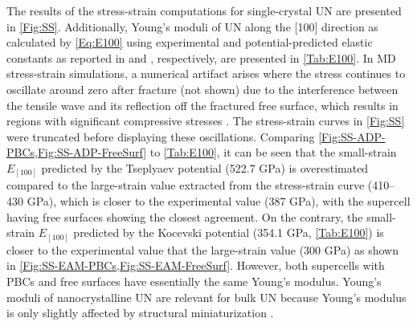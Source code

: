 \documentclass[applsci,article,submit,pdftex,moreauthors]{Definitions/mdpi}
\newcommand{\?}{\stackrel{?}{=}}
\begin{document}
The results of the stress-strain computations for single-crystal UN are presented in \cref{Fig:SS}. Additionally, Young's moduli of UN along the [100] direction as calculated by \cref{Eq:E100} using experimental and potential-predicted elastic constants as reported in \cite{Salleh1986} and \cite{AbdulHameed2024}, respectively, are presented in \cref{Tab:E100}. In MD stress-strain simulations, a numerical artifact arises where the stress continues to oscillate around zero after fracture (not shown) due to the interference between the tensile wave and its reflection off the fractured free surface, which results in regions with significant compressive stresses \cite{Wen2022}. The stress-strain curves in \cref{Fig:SS} were truncated before displaying these oscillations. Comparing \cref{Fig:SS-ADP-PBCs,Fig:SS-ADP-FreeSurf} to \cref{Tab:E100}, it can be seen that the small-strain $E_{[100]}$ predicted by the Tseplyaev potential (522.7 GPa) is overestimated compared to the large-strain value extracted from the stress-strain curve (410--430 GPa), which is closer to the experimental value (387 GPa), with the supercell having free surfaces showing the closest agreement. On the contrary, the small-strain $E_{[100]}$ predicted by the Kocevski potential (354.1 GPa, \cref{Tab:E100}) is closer to the experimental value that the large-strain value (300 GPa) as shown in \cref{Fig:SS-EAM-PBCs,Fig:SS-EAM-FreeSurf}. However, both supercells with PBCs and free surfaces have essentially the same Young's modulus. Young’s moduli of nanocrystalline UN are relevant for bulk UN because Young’s modulus is only slightly affected by structural miniaturization \cite{Pal2020}.
\end{document}

